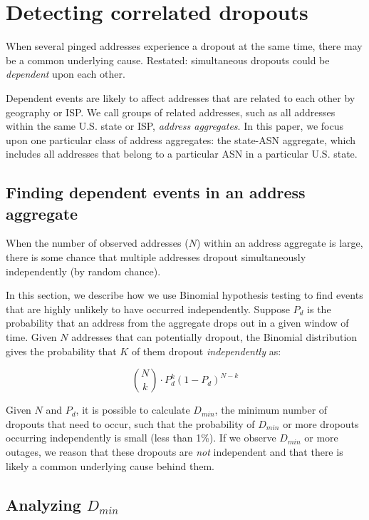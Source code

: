 \section{Detecting correlated dropouts}
\label{sec:method}

When several pinged addresses experience a dropout at the same time,
there may be a common underlying cause. Restated: simultaneous dropouts
could be \emph{dependent} upon each other.

Dependent events are likely to affect addresses that are related to
each other by geography or ISP. We call groups of related addresses, such as all addresses within the
same U.S. state or ISP, \emph{address aggregates}. In this paper, we
focus upon one particular class of address aggregates: the state-ASN
aggregate, which includes all addresses that belong to a particular
ASN in a particular U.S. state. 

\subsection{Finding dependent events in an address aggregate}

When the number of observed addresses ($N$) within an address
aggregate is large, there is some chance that multiple addresses dropout
simultaneously independently (by random chance).

In this section, we describe how we use Binomial hypothesis testing to find events that
are highly unlikely to have occurred independently. Suppose $P_d$ is
the probability that an address from the aggregate drops out in a given window of time. Given
$N$ addresses that can potentially dropout, the Binomial distribution gives the probability that
$K$ of them dropout \emph{independently} as:

\[
{N\choose k} \cdot P_d^k(1-P_d)^{N-k}
\]

Given $N$ and $P_d$, it is possible to calculate $D_{min}$, the minimum number of
dropouts that need to occur, such that the probability of
$D_{min}$ or more dropouts occurring independently is small (less
than 1\%). If we observe $D_{min}$ or more outages, we reason that these dropouts are \emph{not} independent
and that there is likely a common underlying cause behind them.

\subsection{Analyzing $D_{min}$}



